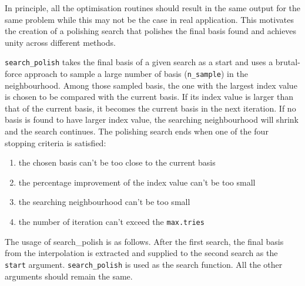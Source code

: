 \documentclass[12pt]{article}
\providecommand{\tightlist}{%
  \setlength{\itemsep}{0pt}\setlength{\parskip}{0pt}}
\begin{document}
In principle, all the optimisation routines should result in the same
output for the same problem while this may not be the case in real
application. This motivates the creation of a polishing search that
polishes the final basis found and achieves unity across different
methods.

\texttt{search\_polish} takes the final basis of a given search as a
start and uses a brutal-force approach to sample a large number of basis
(\texttt{n\_sample}) in the neighbourhood. Among those sampled basis,
the one with the largest index value is chosen to be compared with the
current basis. If its index value is larger than that of the current
basis, it becomes the current basis in the next iteration. If no basis
is found to have larger index value, the searching neighbourhood will
shrink and the search continues. The polishing search ends when one of
the four stopping criteria is satisfied:

\begin{enumerate}
\def\labelenumi{\arabic{enumi})}
\tightlist
\item
  the chosen basis can't be too close to the current basis
\item
  the percentage improvement of the index value can't be too small
\item
  the searching neighbourhood can't be too small
\item
  the number of iteration can't exceed the \texttt{max.tries}
\end{enumerate}

The usage of search\_polish is as follows. After the first search, the
final basis from the interpolation is extracted and supplied to the
second search as the \texttt{start} argument. \texttt{search\_polish} is
used as the search function. All the other arguments should remain the
same.
\end{document}
